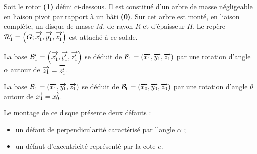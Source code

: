 \documentclass[10pt,fleqn]{article} %
\begin{document}
\def\pathfig{images}

\vspace{5cm}
\pagestyle{fancy}
\thispagestyle{plain}

\def\columnseprulecolor{\color{ocre}}
\setlength{\columnseprule}{0.4pt} 

\def\pathfig{images}

\ifprof
\else
\begin{multicols}{2}
\fi

Soit le rotor \textbf{(1)} défini ci-dessous. Il est constitué d'un arbre de masse négligeable en liaison pivot par rapport à un bâti \textbf{(0)}. Sur cet arbre est monté, en liaison complète, un disque de masse $M$, de rayon $R$ et d'épaisseur $H$. 
Le repère $\mathcal{R}'_1=\left(G;\overrightarrow{x_1'},\overrightarrow{y_1'},\overrightarrow{z_1'} \right)$ est attaché à ce solide.

La base $\mathcal{B}'_1=\left(\overrightarrow{x_1'},\overrightarrow{y_1'},\overrightarrow{z_1'} \right)$ se déduit de $\mathcal{B}_1=\left(\overrightarrow{x_1},\overrightarrow{y_1},\overrightarrow{z_1} \right)$  par une rotation d'angle $\alpha$ autour de $\overrightarrow{z_1}= \overrightarrow{z_1'}$. 

La base $\mathcal{B}_1=\left(\overrightarrow{x_1},\overrightarrow{y_1},\overrightarrow{z_1} \right)$ se déduit de $\mathcal{B}_0=\left(\overrightarrow{x_0},\overrightarrow{y_0},\overrightarrow{z_0} \right)$  par une rotation d'angle $\theta$ autour de $\overrightarrow{x_1}= \overrightarrow{x_0}$. 

Le montage de ce disque présente deux défauts :
\begin{itemize}
\item un défaut de perpendicularité caractérisé par l'angle $\alpha$ ;
\item un défaut d'excentricité représenté par la cote $e$.
\end{itemize}



\end{multicols}
\end{document}
